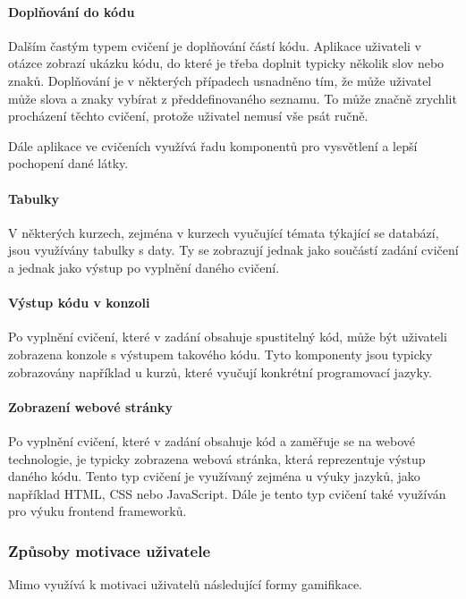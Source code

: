 \paragraph{Doplňování do kódu} Dalším častým typem cvičení je doplňování částí kódu. Aplikace uživateli v otázce zobrazí ukázku kódu, do které je třeba doplnit typicky několik slov nebo znaků. Doplňování je v některých případech usnadněno tím, že může uživatel může slova a znaky vybírat z předdefinovaného seznamu. To může značně zrychlit procházení těchto cvičení, protože uživatel nemusí vše psát ručně.

Dále aplikace ve cvičeních využívá řadu komponentů pro vysvětlení a lepší pochopení dané látky.

\paragraph{Tabulky} V některých kurzech, zejména v kurzech vyučující témata týkající se databází, jsou využívány tabulky s daty. Ty se zobrazují jednak jako součástí zadání cvičení a jednak jako výstup po vyplnění daného cvičení.

\paragraph{Výstup kódu v konzoli} Po vyplnění cvičení, které v zadání obsahuje spustitelný kód, může být uživateli zobrazena konzole s výstupem takového kódu. Tyto komponenty jsou typicky zobrazovány například u kurzů, které vyučují konkrétní programovací jazyky.

\paragraph{Zobrazení webové stránky} Po vyplnění cvičení, které v zadání obsahuje kód a zaměřuje se na webové technologie, je typicky zobrazena webová stránka, která reprezentuje výstup daného kódu. Tento typ cvičení je využívaný zejména u výuky jazyků, jako například HTML, CSS nebo JavaScript. Dále je tento typ cvičení také využíván pro výuku frontend frameworků.

\subsubsection{Způsoby motivace uživatele}

Mimo využívá k motivaci uživatelů následující formy gamifikace. %

